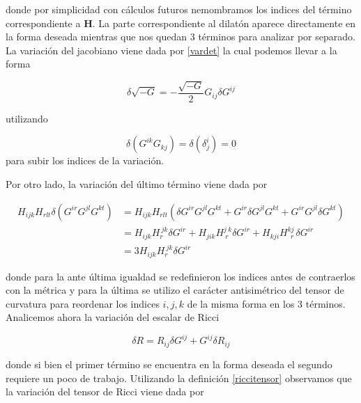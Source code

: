 \documentclass{article}
\numberwithin{equation}{section}
\begin{document}
donde por simplicidad con cálculos futuros nemombramos los indices del término correspondiente a $ \textbf{H} $. La parte correspondiente al dilatón aparece directamente en la forma deseada mientras que nos quedan 3 términos para analizar por separado.\\ 

La variación del jacobiano viene dada por \ref{vardet} la cual podemos llevar a la forma 

\begin{equation}\label{vardet2}
\delta \sqrt{-G} = - \frac{\sqrt{-G}}{2} G_{i j} \delta G^{i j}
\end{equation}

utilizando

\begin{equation*}
\delta (G^{ik}G_{kj})= \delta \left( \delta^{i}_{j}\right) =0
\end{equation*}
para subir los indices de la variación.

Por otro lado, la variación del último término viene dada por

\begin{equation}\label{varh}
\begin{aligned}
 H_{ijk}  H_{rlt} \delta \left(G^{i r} G^{j l} G^{k t} \right) &= H_{ijk}  H_{rlt} \left( \delta G^{i r} G^{j l} G^{k t} + G^{i r} \delta G^{j l} G^{k t} + G^{i r} G^{j l} \delta G^{k t} \right)\\
&= H_{i j k}H_{r}^{ \ j k} \delta G^{i r} + H_{j i k}H_{ \ r \ }^{j \ k} \delta G^{i r} + H_{k j i}H_{ \ \ r \ }^{k j} \delta G^{i r}\\
&= 3 H_{i j k} H_r^{ \ j k} \delta G^{i r}
\end{aligned}
\end{equation}

donde para la ante última igualdad se redefinieron los indices antes de contraerlos con la métrica y para la última se utilizo el carácter antisimétrico del tensor de curvatura para reordenar los indices $ i , j, k $ de la misma forma en los 3 términos.\\

Analicemos ahora la variación del escalar de Ricci

\begin{equation}\label{varr}
\delta R = R_{ij}\delta G^{ij} + G^{ij} \delta R_{ij}
\end{equation}

donde si bien el primer término se encuentra en la forma deseada el segundo requiere un poco de trabajo. Utilizando la definición \ref{riccitensor} observamos que la variación del tensor de Ricci viene dada por
 
\end{document}
